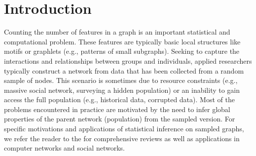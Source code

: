 \section{Introduction}

Counting the number of features in a graph is an important statistical and computational problem. These features are typically basic local structures like motifs \cite{Alon2002} or graphlets \cite{Prvzulj2004} (e.g., patterns of small subgraphs). Seeking to capture the interactions and relationships between groups and individuals, applied researchers typically construct a network from data that has been collected from a random sample of nodes. This scenario is sometimes due to resource constraints (e.g., massive social network, surveying a hidden population) or an inability to gain access the full population (e.g., historical data, corrupted data). Most of the problems encountered in practice are motivated by the need to infer global properties of the parent network (population) from the sampled version. For specific motivations and applications of statistical inference on sampled graphs, we refer the reader to the 
\cite{Duffield2014,Leskovec2006, Kolaczyk2017} for comprehensive reviews as well as applications in computer networks and social networks. 



